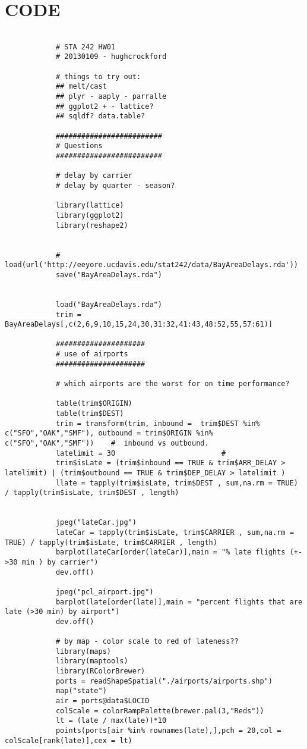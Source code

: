 \documentclass[12pt]{article}
\begin{document}
	\section{CODE}
		\begin{verbatim}
			
			# STA 242 HW01
			# 20130109 - hughcrockford

			# things to try out:
			## melt/cast
			## plyr - aaply - parralle
			## ggplot2 + - lattice?
			## sqldf? data.table?

			#########################
			# Questions
			#########################

			# delay by carrier
			# delay by quarter - season?

			library(lattice)
			library(ggplot2)
			library(reshape2)


			# load(url('http://eeyore.ucdavis.edu/stat242/data/BayAreaDelays.rda'))
			save("BayAreaDelays.rda")


			load("BayAreaDelays.rda")
			trim = BayAreaDelays[,c(2,6,9,10,15,24,30,31:32,41:43,48:52,55,57:61)]

			#####################
			# use of airports
			#####################

			# which airports are the worst for on time performance?

			table(trim$ORIGIN)
			table(trim$DEST)
			trim = transform(trim, inbound =  trim$DEST %in% c("SFO","OAK","SMF"), outbound = trim$ORIGIN %in% c("SFO","OAK","SMF"))	#  inbound vs outbound.
			latelimit = 30                         # 
			trim$isLate = (trim$inbound == TRUE & trim$ARR_DELAY > latelimit) | (trim$outbound == TRUE & trim$DEP_DELAY > latelimit )
			llate = tapply(trim$isLate, trim$DEST , sum,na.rm = TRUE) / tapply(trim$isLate, trim$DEST , length)  


			jpeg("lateCar.jpg")
			lateCar = tapply(trim$isLate, trim$CARRIER , sum,na.rm = TRUE) / tapply(trim$isLate, trim$CARRIER , length)  
			barplot(lateCar[order(lateCar)],main = "% late flights (+- >30 min ) by carrier")
			dev.off()

			jpeg("pcl_airport.jpg")
			barplot(late[order(late)],main = "percent flights that are late (>30 min) by airport")
			dev.off()

			# by map - color scale to red of lateness??
			library(maps)
			library(maptools)
			library(RColorBrewer)
			ports = readShapeSpatial("./airports/airports.shp")
			map("state")
			air = ports@data$LOCID
			colScale = colorRampPalette(brewer.pal(3,"Reds"))
			lt = (late / max(late))*10
			points(ports[air %in% rownames(late),],pch = 20,col = colScale[rank(late)],cex = lt)


\end{verbatim}
\end{document}
